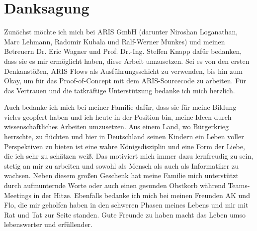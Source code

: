 
\bigskip

\begingroup
	\let\clearpage\relax
	\let\cleardoublepage\relax
	\let\cleardoublepage\relax
	\chapter*{Danksagung}

Zunächst möchte ich mich bei ARIS GmbH (darunter Niroshan Loganathan, Marc Lehmann, Radomir Kubala und Ralf-Werner Munkes) und meinen Betreuern Dr. Eric Wagner und Prof. Dr.-Ing. Steffen
    Knapp dafür bedanken, dass sie es mir ermöglicht haben, diese Arbeit umzusetzen. Sei es von den ersten Denkanstößen, ARIS Flows als Ausführungsschicht zu verwenden, bis hin zum
    Okay, um für das Proof-of-Concept mit dem ARIS-Sourcecode zu arbeiten. Für das Vertrauen und die tatkräftige Unterstützung
    bedanke ich mich herzlich.

\noindent Auch bedanke ich mich bei meiner Familie dafür, dass sie für meine Bildung vieles geopfert haben und ich heute in der Position bin, meine Ideen durch
    wissenschaftliches Arbeiten umzusetzen. Aus einem Land, wo Bürgerkrieg herrschte, zu flüchten und hier in Deutschland seinen Kindern ein Leben voller
    Perspektiven zu bieten ist eine wahre Königsdisziplin und eine Form der Liebe, die ich sehr zu schätzen weiß. Das motiviert mich immer dazu lernfreudig zu sein, stetig an mir zu arbeiten und sowohl als Mensch als auch als Informatiker zu wachsen. Neben diesem großen Geschenk hat meine
    Familie mich unterstützt durch aufmunternde Worte oder auch einen gesunden Obstkorb während Teams-Meetings in der Hitze.
Ebenfalls bedanke ich mich bei meinen Freunden AK und Flo, die mir geholfen haben in den schweren Phasen meines Lebens und mir mit Rat und Tat zur Seite standen. Gute Freunde zu haben macht das Leben umso lebenswerter und erfüllender. 

\endgroup
